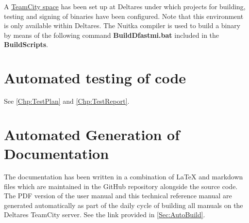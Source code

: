 A \href{https://dpcbuild.deltares.nl/project/DFast_DFastMorphologicalImpact}{TeamCity space} has been set up at Deltares under which projects for building, testing and signing of binaries have been configured.
Note that this environment is only available within Deltares.
The Nuitka compiler is used to build a binary by means of the following command \textbf{BuildDfastmi.bat} included in the \textbf{BuildScripts}.

\section{Automated testing of code}

See \autoref{Chp:TestPlan} and \autoref{Chp:TestReport}.

\section{Automated Generation of Documentation}

The documentation has been written in a combination of LaTeX and markdown files which are maintained in the GitHub repository alongside the source code.
The PDF version of the user manual and this technical reference manual are generated automatically as part of the daily cycle of building all manuals on the Deltares TeamCity server.
See the link provided in \autoref{Sec:AutoBuild}.